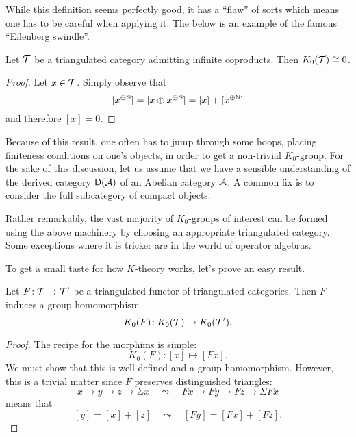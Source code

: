 While this definition seems perfectly good, it has a ``flaw'' of sorts which means one has to be careful when applying it. The below is an example of the
famous ``Eilenberg swindle''.

\begin{proposition}
	Let \(\mathcal{T}\) be a triangulated category admitting infinite coproducts. Then \(K_0(\mathcal{T}) \cong 0\).
\end{proposition}
\begin{proof}
Let \(x\in\mathcal{T}\). Simply observe that
\[ [x^{\oplus\mathbb{N}}] = [x\oplus x^{\oplus\mathbb{N}}] = [x] + [x^{\oplus\mathbb{N}}] \]
and therefore \([x] = 0\).
\end{proof}

\begin{remark}
	Because of this result, one often has to jump through some hoops, placing finiteness conditions on one's objects, in order to get a non-trivial \(K_0\)-group. For the sake
	of this discussion, let us assume that we have a sensible understanding of the derived category \(\mathsf{D}(\mathcal{A})\) of an Abelian category \(\mathcal{A}\).
	A common fix is to consider the full subcategory of compact objects.

	Rather remarkably, the vast majority of \(K_0\)-groups of interest can be formed using the above machinery by choosing an appropriate triangulated category. Some
	exceptions where it is tricker are in the world of operator algebras.
\end{remark}

To get a small taste for how \(K\)-theory works, let's prove an easy result.
\begin{proposition}
	Let \(F\!:\mathcal{T}\to\mathcal{T}'\) be a triangulated functor of triangulated categories. Then \(F\) induces a group homomorphism
	\[ K_0(F)\!:K_0(\mathcal{T})\to K_0(\mathcal{T}'). \]
\end{proposition}
\begin{proof}
The recipe for the morphims is simple:
\[ K_0(F)\!: [x]\mapsto [Fx]. \]
We must show that this is well-defined and a group homomorphism. However, this is a trivial matter since \(F\) preserves distinguished triangles:
\[ x \to y \to z \to \Sigma x \quad \leadsto \quad Fx \to Fy \to Fz \to \Sigma Fx \]
means that
\[ [y] = [x] + [z] \quad \leadsto \quad [Fy] = [Fx] + [Fz]. \]
\end{proof}

